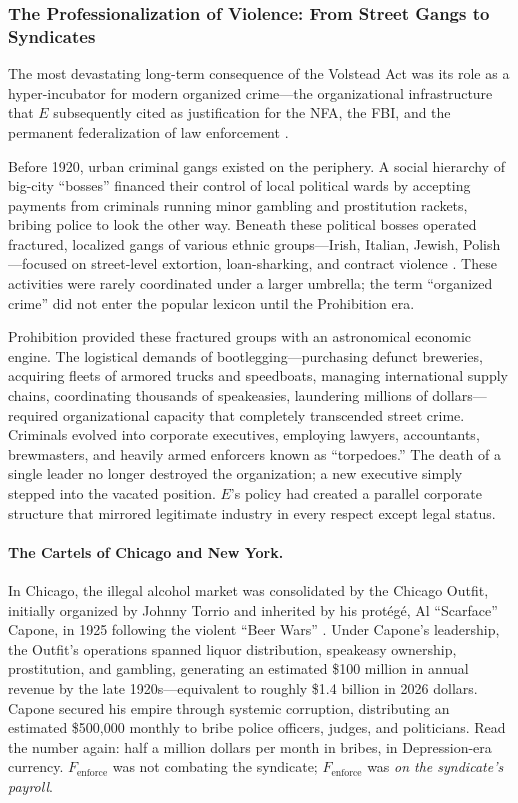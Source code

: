 \documentclass[12pt,openany]{book}
\begin{document}
\subsubsection{The Professionalization of Violence: From Street Gangs to Syndicates}

The most devastating long-term consequence of the Volstead Act was its role as a hyper-incubator for modern organized crime---the organizational infrastructure that $E$ subsequently cited as justification for the NFA, the FBI, and the permanent federalization of law enforcement \cite{mobmuseum_profits, archives_gangster}.

Before 1920, urban criminal gangs existed on the periphery. A social hierarchy of big-city ``bosses'' financed their control of local political wards by accepting payments from criminals running minor gambling and prostitution rackets, bribing police to look the other way. Beneath these political bosses operated fractured, localized gangs of various ethnic groups---Irish, Italian, Jewish, Polish---focused on street-level extortion, loan-sharking, and contract violence \cite{ebsco_organized, ebsco_gangsters}. These activities were rarely coordinated under a larger umbrella; the term ``organized crime'' did not enter the popular lexicon until the Prohibition era.

Prohibition provided these fractured groups with an astronomical economic engine. The logistical demands of bootlegging---purchasing defunct breweries, acquiring fleets of armored trucks and speedboats, managing international supply chains, coordinating thousands of speakeasies, laundering millions of dollars---required organizational capacity that completely transcended street crime. Criminals evolved into corporate executives, employing lawyers, accountants, brewmasters, and heavily armed enforcers known as ``torpedoes.'' The death of a single leader no longer destroyed the organization; a new executive simply stepped into the vacated position. $E$'s policy had created a parallel corporate structure that mirrored legitimate industry in every respect except legal status.

\paragraph{The Cartels of Chicago and New York.}
In Chicago, the illegal alcohol market was consolidated by the Chicago Outfit, initially organized by Johnny Torrio and inherited by his prot\'{e}g\'{e}, Al ``Scarface'' Capone, in 1925 following the violent ``Beer Wars'' \cite{mobmuseum_profits}. Under Capone's leadership, the Outfit's operations spanned liquor distribution, speakeasy ownership, prostitution, and gambling, generating an estimated \$100 million in annual revenue by the late 1920s---equivalent to roughly \$1.4 billion in 2026 dollars. Capone secured his empire through systemic corruption, distributing an estimated \$500,000 monthly to bribe police officers, judges, and politicians. Read the number again: half a million dollars per month in bribes, in Depression-era currency. $F_{\text{enforce}}$ was not combating the syndicate; $F_{\text{enforce}}$ was \textit{on the syndicate's payroll}.
\end{document}
